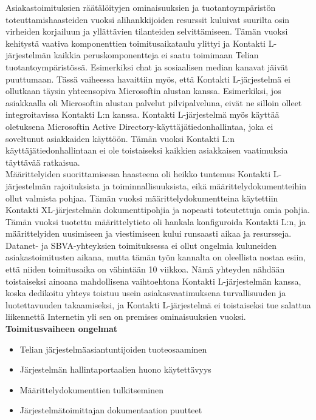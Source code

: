 \documentclass[finnish,12pt,a4paper,pdftex]{article}
\begin{document}
Asiakastoimituksien räätälöityjen ominaisuuksien ja tuotantoympäristön toteuttamishaasteiden vuoksi alihankkijoiden resurssit kuluivat suurilta osin virheiden korjailuun ja yllättävien tilanteiden selvittämiseen. Tämän vuoksi kehitystä vaativa komponenttien toimitusaikataulu ylittyi ja Kontakti L-järjestelmän kaikkia peruskomponentteja ei saatu toimimaan Telian tuotantoympäristössä. Esimerkiksi chat ja sosiaalisen median kanavat jäivät puuttumaan. Tässä vaiheessa havaittiin myös, että Kontakti L-järjestelmä ei ollutkaan täysin yhteensopiva Microsoftin alustan kanssa. Esimerkiksi, jos asiakkaalla oli Microsoftin alustan palvelut pilvipalveluna, eivät ne silloin olleet integroitavissa Kontakti L:n kanssa. Kontakti L-järjestelmä myös käyttää oletuksena Microsoftin Active Directory-käyttäjätiedonhallintaa, joka ei soveltunut asiakkaiden käyttöön. Tämän vuoksi Kontakti L:n käyttäjätiedonhallintaan ei ole toistaiseksi kaikkien asiakkaisen vaatimuksia täyttävää ratkaisua.\\

\noindent Määrittelyiden suorittamisessa haasteena oli heikko tuntemus Kontakti L-järjestelmän rajoituksista ja toiminnallisuuksista, eikä määrittelydokumentteihin ollut valmista pohjaa. Tämän vuoksi määrittelydokumentteina käytettiin Kontakti XL-järjestelmän dokumenttipohjia ja nopeasti toteutettuja omia pohjia. Tämän vuoksi tuotettu määrittelytieto oli hankala konfiguroida Kontakti L:n, ja määrittelyiden uusimiseen ja viestimiseen kului runsaasti aikaa ja resursseja.\\

Datanet- ja SBVA-yhteyksien toimituksessa ei ollut ongelmia kuluneiden asiakastoimitusten aikana, mutta tämän työn kannalta on oleellista nostaa esiin, että niiden toimitusaika on vähintään 10 viikkoa. Nämä yhteyden nähdään toistaiseksi ainoana mahdollisena vaihtoehtona Kontakti L-järjestelmän kanssa, koska dedikoitu yhteys toistuu usein asiakasvaatimuksena turvallisuuden ja luotettavuuden takaamiseksi, ja Kontakti L-järjestelmä ei toistaiseksi tue salattua liikennettä Internetin yli sen on premises ominaisuuksien vuoksi.\\

\textbf{Toimitusvaiheen ongelmat}\\

\begin{itemize}
    \item Telian järjestelmäasiantuntijoiden tuoteosaaminen
    \item Järjestelmän hallintaportaalien huono käytettävyys
    \item Määrittelydokumenttien tulkitseminen
    \item Järjestelmätoimittajan dokumentaation puutteet
\end{itemize}
\end{document}
